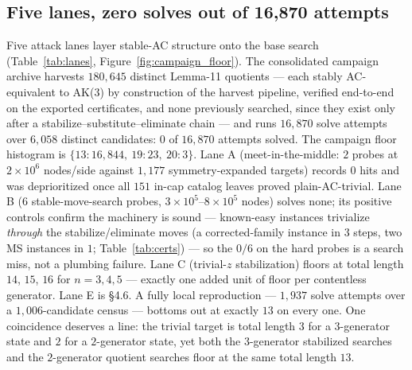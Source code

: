 \subsection{Five lanes, zero solves out of 16,870 attempts}

Five attack lanes layer stable-AC structure onto the base search (Table~\ref{tab:lanes},
Figure~\ref{fig:campaign_floor}). The consolidated campaign archive harvests $180{,}645$
distinct Lemma-11 quotients --- each stably AC-equivalent to AK(3) by construction of the
harvest pipeline, verified end-to-end on the exported certificates, and none previously
searched, since they exist only after a stabilize--substitute--eliminate chain --- and runs
$16{,}870$ solve attempts over $6{,}058$ distinct candidates: $0$ of $16{,}870$ attempts
solved. The campaign floor histogram is $\{13\!:\!16{,}844,\ 19\!:\!23,\ 20\!:\!3\}$. Lane
A (meet-in-the-middle: $2$ probes at $2\times10^6$ nodes/side against $1{,}177$
symmetry-expanded targets) records $0$ hits and was deprioritized once all $151$ in-cap
catalog leaves proved plain-AC-trivial. Lane B ($6$ stable-move-search probes,
$3\times10^5$--$8\times10^5$ nodes) solves none; its positive controls confirm the machinery
is sound --- known-easy instances trivialize \emph{through} the stabilize/eliminate moves (a
corrected-family instance in $3$ steps, two MS instances in $1$; Table~\ref{tab:certs}) ---
so the $0/6$ on the hard probes is a search miss, not a plumbing failure. Lane C
(trivial-$z$ stabilization) floors at total length $14$, $15$, $16$ for $n=3,4,5$ --- exactly
one added unit of floor per contentless generator. Lane E is \S4.6. A fully local
reproduction --- $1{,}937$ solve attempts over a $1{,}006$-candidate census --- bottoms out at
exactly $13$ on every one. One coincidence deserves a line: the trivial target is total
length $3$ for a $3$-generator state and $2$ for a $2$-generator state, yet both the
$3$-generator stabilized searches and the $2$-generator quotient searches floor at the same
total length $13$.

\begin{table}[tbp]
\centering
\caption{Five attack lanes layering stable-AC structure on the base search: $0$ of
$16{,}870$ Lane-D solve attempts (over $6{,}058$ distinct candidates from $180{,}645$
harvested quotients) and $0$ of the $14$ grid probes (Lanes A--C) succeed, all flooring
within their searched budgets.}
\label{tab:lanes}
\footnotesize
\setlength{\tabcolsep}{3pt}%

\end{table}

